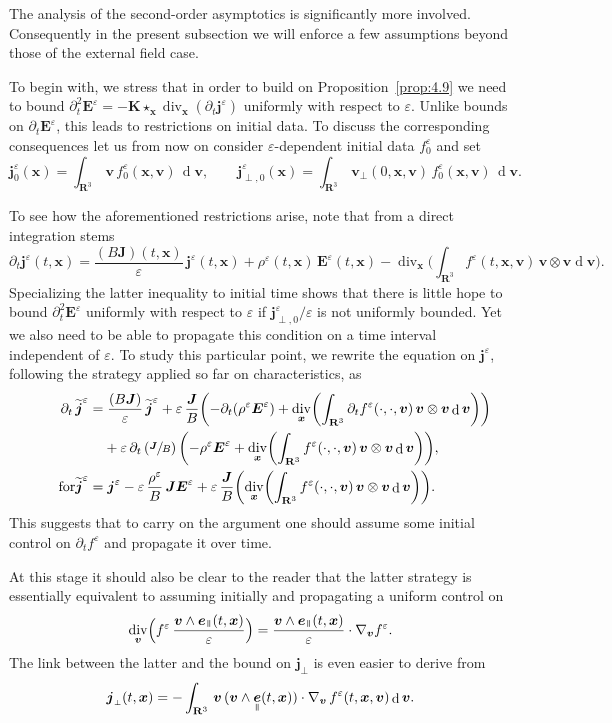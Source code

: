 \documentclass[10pt]{amsart}
\newcommand{\sperp}{{\scriptscriptstyle\perp}}
\let\eps\varepsilon
\let\d\partial
\DeclareMathOperator\dD{d}\let\dd\dD
\DeclareMathOperator{\Div}{div}
\theoremstyle{plain}
\theoremstyle{definition}
\newcommand\R{\mathbf R}
\newcommand\bE{{\boldsymbol E}}
\newcommand\bJ{{\boldsymbol J}}
\newcommand\bK{{\boldsymbol K}}
\newcommand\bfj{{\boldsymbol j}}
\newcommand\bfv{{\boldsymbol v}}
\newcommand\bfx{{\boldsymbol x}}
\DeclareMathOperator{\beD}{\boldsymbol{e}}
\newcommand\eDpar{\beD_\mypar}
\newcommand\bvperp{\bfv_{\!\sperp}}
\newcommand{\mypar}{{\mkern3mu\vphantom{\perp}\vrule depth 0pt\mkern2mu\vrule depth 0pt\mkern3mu}}
\begin{document}
The analysis of the second-order asymptotics is significantly more involved. Consequently in the present subsection we will enforce a few assumptions beyond those of the external field case.

To begin with, we stress that in order to build on Proposition~\ref{prop:4.9} we need to bound $\d_t^2\bE^\eps=-\bK\star_\bfx \Div_\bfx(\d_t\bfj^\eps)$ uniformly with respect to $\eps$. Unlike bounds on $\d_t\bE^\eps$, this leads to restrictions on initial data. To discuss the corresponding consequences let us from now on consider $\eps$-dependent initial data $f_0^\eps$ and set
\[
\bfj_0^\eps(\bfx)=
\int_{\R^3}\,\bfv\,f_0^\eps(\bfx,\bfv)\,\dD \bfv,\qquad
\bfj_{\perp,0}^\eps(\bfx)=
\int_{\R^3}\,\bvperp(0,\bfx,\bfv)\,f_0^\eps(\bfx,\bfv)\,\dD \bfv.
\]

To see how the aforementioned restrictions arise, note that from a direct integration stems
\[
\d_t\bfj^\eps(t,\bfx)
=\frac{(B\bJ)(t,\bfx)}{\eps}\,\bfj^\eps(t,\bfx)
+\rho^\eps(t,\bfx)\,\bE^\eps(t,\bfx)
-\Div_\bfx\biggl(\int_{\R^3}f^\eps(t,\bfx,\bfv)\,\bfv\otimes\bfv\dD \bfv\biggr).
\]
Specializing the latter inequality to initial time shows that there is little hope to bound $\d_t^2\bE^\eps$ uniformly with respect to $\eps$ if $\bfj_{\perp,0}^\eps/\eps$ is not uniformly bounded. Yet we also need to be able to propagate this condition on a time interval independent of $\eps$. To study this particular point, we rewrite the equation on $\bfj^\eps$, following the strategy applied so far on characteristics, as
\begin{align*}
\d_t\,\widetilde{\bfj}^\eps
&
=\frac{(B\bJ)}{\eps}\,\widetilde{\bfj}^\eps
+\eps\,\frac{\bJ}{B}\biggl(
-\d_t(\rho^\eps\bE^\eps)
+\Div_\bfx\biggl(\int_{\R^3}\d_tf^\eps(\cdot,\cdot,\bfv)\,\bfv\otimes\bfv\dD \bfv\biggr)\biggr)
\\
&\hphantom{{}=}
+\eps\,\d_t\left(\sfrac{\bJ}{B}\right)\biggl(
-\rho^\eps\bE^\eps
+\Div_\bfx\biggl(\int_{\R^3}f^\eps(\cdot,\cdot,\bfv)\,\bfv\otimes\bfv\dD \bfv\biggr)\biggr),\\
\tag*{for}
\widetilde{\bfj}^\eps
&=
\bfj^\eps-\eps\,\frac{\rho^\eps}{B}\,\bJ\bE^\eps
+\eps\,\frac{\bJ}{B}\biggl(\Div_\bfx\biggl(\int_{\R^3}f^\eps(\cdot,\cdot,\bfv)\,\bfv\otimes\bfv\dD \bfv\biggr)\biggr).
\end{align*}
This suggests that to carry on the argument one should assume some initial control on $\d_tf^\eps$ and propagate it over time.

At this stage it should also be clear to the reader that the latter strategy is essentially equivalent to assuming initially and propagating a uniform control on
\[
\Div_\bfv\Bigl(f^\eps\,\frac{\bfv\wedge \eDpar(t,\bfx)}{\eps}\Bigr)
=\frac{\bfv\wedge \eDpar(t,\bfx)}{\eps}\cdot\nabla_\bfv f^\eps.
\]
The link between the latter and the bound on $\bfj_\sperp$ is even easier to derive from
\[
\bfj_\sperp(t,\bfx)=
-\int_{\R^3}\,\bfv\,(\bfv\wedge \eDpar(t,\bfx))\cdot\nabla_\bfv\,f^\eps(t,\bfx,\bfv)\dD \bfv.
\]
\end{document}
